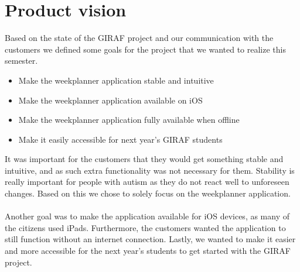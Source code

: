 \section{Product vision}\label{sec:introduction-product-vision}
Based on the state of the GIRAF project and our communication with the customers we defined some goals for the project that we wanted to realize this semester.
\begin{itemize}
    \item Make the weekplanner application stable and intuitive
    \item Make the weekplanner application available on iOS
    \item Make the weekplanner application fully available when offline
    \item Make it easily accessible for next year's GIRAF students
\end{itemize}
It was important for the customers that they would get something stable and intuitive, and as such extra functionality was not necessary for them.
Stability is really important for people with autism as they do not react well to unforeseen changes.
Based on this we chose to solely focus on the weekplanner application.
\\\\
Another goal was to make the application available for iOS devices, as many of the citizens used iPads.
Furthermore, the customers wanted the application to still function without an internet connection.
Lastly, we wanted to make it easier and more accessible for the next year's students to get started with the GIRAF project.